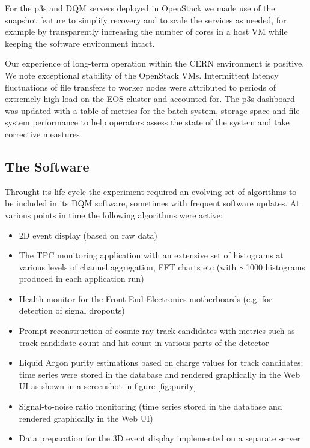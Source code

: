 \documentclass{webofc}
\begin{document}
For the p3s and DQM servers deployed in OpenStack we made
use of the snapshot feature to simplify recovery and to scale the services as
needed, for example by transparently increasing the number of cores in a host
VM while keeping the software environment intact.

Our experience of long-term operation within the CERN environment
is positive. We note exceptional stability of the OpenStack VMs.
Intermittent latency fluctuations of file transfers to worker nodes
were attributed to periods of extremely high load on the EOS cluster
and accounted for. The p3s dashboard was updated with
a table of metrics for the batch system, storage space and
file system performance to help operators assess the state of the
system and take corrective meastures.

\subsection{The Software}
\label{sec:software}

Throught its life cycle the experiment required an evolving set of algorithms to
be included in its DQM software, sometimes with frequent software updates.
At various points in time the following algorithms were active:

\begin{itemize}

\item 2D event display (based on raw data)

\item The TPC monitoring application with an extensive set of histograms at various
levels of channel aggregation, FFT charts etc (with $\sim$1000 histograms produced
in each application run)

\item Health monitor for the Front End Electronics motherboards (e.g. for detection of
signal dropouts)

\item Prompt reconstruction of cosmic ray track candidates with metrics such as
track candidate count and hit count in various parts of the detector

\item Liquid Argon purity estimations based on charge values for track candidates;
time series were stored in the database and rendered graphically in the Web UI as shown in
a screenshot in figure \ref{fig:purity}

\item Signal-to-noise ratio monitoring (time series stored in the database and rendered graphically in the Web UI)

\item Data preparation for the 3D event display implemented on a separate server

\end{itemize}
\end{document}
